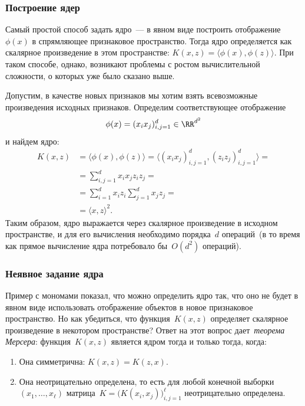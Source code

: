 \documentclass[12pt,fleqn]{article}
\begin{document}
\subsubsection{Построение ядер}
Самый простой способ задать ядро~--- в явном виде построить
отображение~$\phi(x)$ в спрямляющее признаковое пространство.
Тогда ядро определяется как скалярное произведение в этом
пространстве: $K(x, z) = \langle \phi(x), \phi(z) \rangle$.
При таком способе, однако, возникают проблемы с ростом вычислительной сложности,
о которых уже было сказано выше.

Допустим, в качестве новых признаков мы хотим взять всевозможные
произведения исходных признаков.
Определим соответствующее отображение
\[
    \phi(x)
    =
    (x_i x_j)_{i, j = 1}^{d}
    \in
    \RR^{d^2}
\]
и найдем ядро:
\begin{align*}
    K(x, z)
    &=
    \langle \phi(x), \phi(z) \rangle
    =
    \langle (x_i x_j)_{i, j = 1}^{d}, (z_i z_j)_{i, j = 1}^{d} \rangle
    =\\
    &=
    \sum_{i, j = 1}^{d}
        x_i x_j z_i z_j
    =\\
    &=
    \sum_{i = 1}^{d} x_i z_i
    \sum_{j = 1}^{d} x_j z_j
    =\\
    &=
    \langle x, z \rangle^2.
\end{align*}
Таким образом, ядро выражается через скалярное произведение
в исходном пространстве,
и для его вычисления необходимо порядка~$d$ операций~(в то время
как прямое вычисление ядра потребовало бы~$O(d^2)$ операций).

\subsubsection{Неявное задание ядра}
Пример с мономами показал, что можно определить ядро так,
что оно не будет в явном виде использовать отображение объектов
в новое признаковое пространство.
Но как убедиться, что функция~$K(x, z)$ определяет скалярное
произведение в некотором пространстве?
Ответ на этот вопрос дает~\emph{теорема Мерсера}:
функция~$K(x, z)$ является ядром тогда и только тогда, когда:
\begin{enumerate}
    \item Она симметрична: $K(x, z) = K(z, x)$.
    \item Она неотрицательно определена, то есть для
        любой конечной выборки~$(x_1, \dots, x_\ell)$
        матрица~$K = \bigl( K(x_i, x_j) \bigr)_{i, j = 1}^{\ell}$
        неотрицательно определена.
\end{enumerate}
\end{document}
